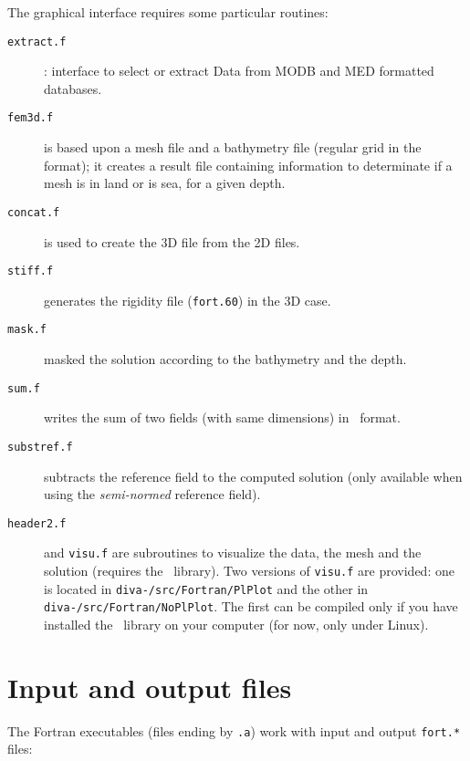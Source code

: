 The graphical interface requires some particular routines:
\begin{description}
\item[\texttt{extract.f}]: interface to select or extract Data from MODB and MED formatted databases.
\vspace{.25cm}
\item[\texttt{fem3d.f}] is based upon a mesh file and a bathymetry file (regular grid in the \gher\, format); it creates a result file containing information to determinate if a mesh is in land or is sea, for a given depth.
\vspace{.25cm}
\item[\texttt{concat.f}] is used to create the 3D file from the 2D files.
\item[\texttt{stiff.f}] generates the rigidity file (\texttt{fort.60}) in the 3D case.
\item[\texttt{mask.f}] masked the solution according to the bathymetry and the depth.
\item[\texttt{sum.f}] writes the sum of two fields (with same dimensions) in \gher\, format.
\item[\texttt{substref.f}] subtracts the reference field to the computed solution (only available when using the \textit{semi-normed} reference field).
\vspace{.25cm}
\item[\texttt{header2.f}] and \texttt{visu.f} are subroutines to visualize the data, the mesh and the solution (requires the \plplot\, library). Two versions of \texttt{visu.f} are provided: one is located in \texttt{diva-\divaversion/\-src/\-Fortran/\-PlPlot} and the other in \texttt{diva-\divaversion/\-src/\-Fortran/\-NoPlPlot}. The first can be compiled only if you have installed the \plplot\, library on your computer (for now, only under Linux).
\end{description}




\section{Input and output files}

The Fortran executables (files ending by \texttt{.a}) work with input and output \texttt{fort.*} files:

